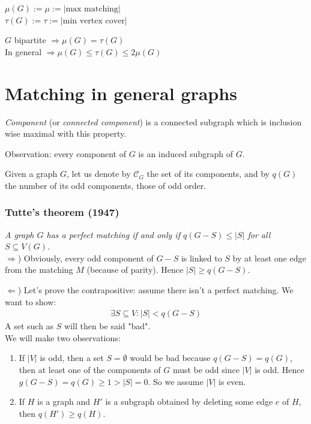 \bigskip
$\mu(G) := \mu := |\text{max matching}|$\\
$\tau(G) := \tau := |\text{min vertex cover}|$

$G$ bipartite $\Rightarrow \mu(G) = \tau(G)$\\
In general $\Rightarrow \mu(G) \leq \tau(G) \leq 2 \mu(G)$

\section{Matching in general graphs}
\textit{Component} (or \textit{connected component}) is a connected subgraph which is inclusion wise
maximal with this property.

Observation: every component of $G$ is an induced subgraph of $G$.

\bigskip
Given a graph $G$, let us denote by $\mathcal{C}_G$ the set of its components, and by $q(G)$ the number of its odd components, those of odd order.


		\subsubsection{Tutte's theorem (1947)} 
		
		\textit{A graph $G$ has a perfect matching if and only if $q(G - S) \leq |S|$ for all $S \subseteq V(G)$.}\\

                $\Rightarrow$)
                Obviously, every odd component of $G - S$ is linked to $S$ by at least one edge from the matching $M$ (because of parity). Hence $|S| \geq q(G - S)$.

                $\Leftarrow$)
                Let's prove the contrapositive: assume there isn't a perfect matching. We want to show:
			\begin{eqnarray}
				\exists S \subseteq V : |S| < q(G - S)
			\end{eqnarray} 
			A set such as $S$ will then be said "bad".\\
		
		We will make two observations:
		\begin{enumerate}
			\item If $|V|$ is odd, then a set $S = \emptyset$ would be bad because $q(G - S) = q (G)$, then at least one of the components of $G$ must be odd since $|V|$ is odd. Hence $g(G -S) = q(G) \geq 1 > |S| = 0$. So we assume $|V|$ is even.
			\item If $H$ is a graph and $H'$ is a subgraph obtained by deleting some edge $e$ of $H$, then $q(H') \geq q(H)$.
		\end{enumerate}

